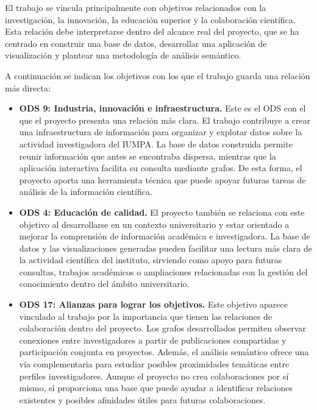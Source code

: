 \documentclass[11pt,spanish,listoffigures,listoftables]{tfgetsinf}
\begin{document}
El trabajo se vincula principalmente con objetivos relacionados con la investigación, la innovación, la educación superior y la colaboración científica. Esta relación debe interpretarse dentro del alcance real del proyecto, que se ha centrado en construir una base de datos, desarrollar una aplicación de visualización y plantear una metodología de análisis semántico.

A continuación se indican los objetivos con los que el trabajo guarda una relación más directa:

\begin{itemize}
    \item \textbf{ODS 9: Industria, innovación e infraestructura.}  
    Este es el ODS con el que el proyecto presenta una relación más clara. El trabajo contribuye a crear una infraestructura de información para organizar y explotar datos sobre la actividad investigadora del IUMPA. La base de datos construida permite reunir información que antes se encontraba dispersa, mientras que la aplicación interactiva facilita su consulta mediante grafos. De esta forma, el proyecto aporta una herramienta técnica que puede apoyar futuras tareas de análisis de la información científica.

    \item \textbf{ODS 4: Educación de calidad.}  
    El proyecto también se relaciona con este objetivo al desarrollarse en un contexto universitario y estar orientado a mejorar la comprensión de información académica e investigadora. La base de datos y las visualizaciones generadas pueden facilitar una lectura más clara de la actividad científica del instituto, sirviendo como apoyo para futuras consultas, trabajos académicos o ampliaciones relacionadas con la gestión del conocimiento dentro del ámbito universitario.

    \item \textbf{ODS 17: Alianzas para lograr los objetivos.}  
    Este objetivo aparece vinculado al trabajo por la importancia que tienen las relaciones de colaboración dentro del proyecto. Los grafos desarrollados permiten observar conexiones entre investigadores a partir de publicaciones compartidas y participación conjunta en proyectos. Además, el análisis semántico ofrece una vía complementaria para estudiar posibles proximidades temáticas entre perfiles investigadores. Aunque el proyecto no crea colaboraciones por sí mismo, sí proporciona una base que puede ayudar a identificar relaciones existentes y posibles afinidades útiles para futuras colaboraciones.
\end{itemize}
\end{document}
